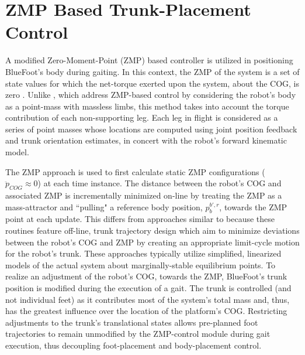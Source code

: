 %



	\section{ZMP Based Trunk-Placement Control}

		A  modified Zero-Moment-Point (ZMP) based controller is utilized in positioning BlueFoot's body during gaiting. In this context, the ZMP of the system is a set of state values for which the net-torque exerted upon the system, about the COG, is zero \cite{Kajita2003,Katie2009}. Unlike \cite{Takanishi1989,Kurazume2003}, which address ZMP-based control by considering the robot's body as a point-mass with massless limbs, this method takes into account the torque contribution of each non-supporting leg. Each leg in flight is considered as a series of point masses whose locations are computed using joint position feedback and trunk orientation estimates, in concert with the robot's forward kinematic model.
		
		The ZMP approach is used to first calculate static ZMP configurations ( \IE $\ddot{p}_{COG}\approx0$) at each time instance. The distance between the robot's COG and associated ZMP is incrementally minimized on-line by treating the ZMP as a  mass-attractor and ``pulling" a reference body position, ${p}_{b}^{b',r}$, towards the ZMP point at each update. This differs from approaches similar to \cite{Kurazume2003} because these routines feature off-line, trunk trajectory design which aim to minimize deviations between the robot's COG and ZMP by creating an appropriate limit-cycle motion for the robot's trunk. These approaches typically utilize simplified, linearized models of the actual system about marginally-stable equilibrium points. To realize an adjustment of the robot's COG, towards the ZMP, BlueFoot's trunk position is modified during the execution of a gait. The trunk is controlled (and not individual feet) as it contributes most of the system's total mass and, thus, has the greatest influence over the location of the platform's COG. Restricting adjustments to the trunk's translational states allows pre-planned foot trajectories to remain unmodified by the ZMP-control module during gait execution, thus decoupling foot-placement and body-placement control.


